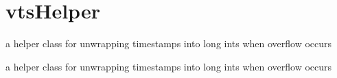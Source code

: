 \hypertarget{group__vtsHelper}{}\section{vts\+Helper}
\label{group__vtsHelper}


a helper class for unwrapping timestamps into long ints when overflow occurs  


a helper class for unwrapping timestamps into long ints when overflow occurs 

